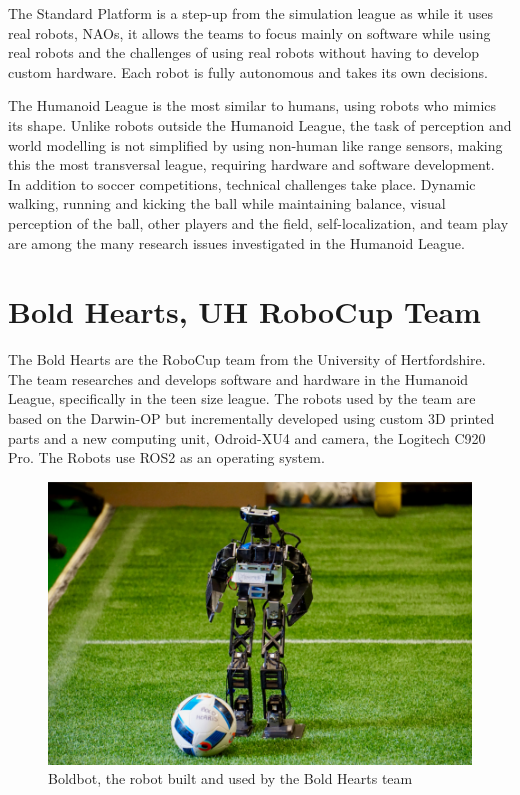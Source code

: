  The Standard Platform is a step-up from the simulation league as while it uses real robots, NAOs, it allows the teams to focus mainly on software while using real robots and the challenges of using real robots without having to develop custom hardware. Each robot is fully autonomous and takes its own decisions.

 The Humanoid League is the most similar to humans, using robots who mimics its shape. Unlike robots outside the Humanoid League, the task of perception and world modelling is not simplified by using non-human like range sensors, making this the most transversal league, requiring hardware and software development. 
 In addition to soccer competitions, technical challenges take place. 
 Dynamic walking, running and kicking the ball while maintaining balance, visual perception of the ball, other players and the field, self-localization, and team play are among the many research issues investigated in the Humanoid League.

 \section{Bold Hearts, UH RoboCup Team}
 The Bold Hearts are the RoboCup team from the University of Hertfordshire. The team researches and develops software and hardware in the Humanoid League, specifically in the teen size league.
 The robots used by the team are based on the Darwin-OP but incrementally developed using custom 3D printed parts and a new computing unit, Odroid-XU4 and camera, the Logitech C920 Pro. 
 The Robots use ROS2 as an operating system.
 \cite{boldhearts}
 \begin{figure}[H]
 \centering
 \includegraphics[scale=0.26]{figures/boldbot_2.png}
 \caption{Boldbot, the robot built and used by the Bold Hearts team}
 \end{figure}

